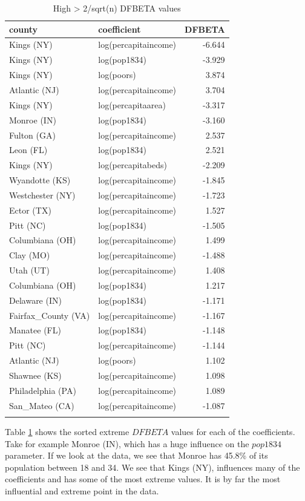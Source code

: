 \documentclass[]{article}
\let\oldparagraph\paragraph
\renewcommand{\paragraph}[1]{\oldparagraph{#1}\mbox{}}
\begin{document}
\begin{longtable}[]{@{}llr@{}}
\caption{High > 2/sqrt(n) DFBETA values}\tabularnewline
\toprule
county & coefficient & DFBETA\tabularnewline
\midrule
\endhead
Kings (NY) & log(percapitaincome) & -6.644\tabularnewline
Kings (NY) & log(pop1834) & -3.929\tabularnewline
Kings (NY) & log(poors) & 3.874\tabularnewline
Atlantic (NJ) & log(percapitaincome) & 3.704\tabularnewline
Kings (NY) & log(percapitaarea) & -3.317\tabularnewline
Monroe (IN) & log(pop1834) & -3.160\tabularnewline
Fulton (GA) & log(percapitaincome) & 2.537\tabularnewline
Leon (FL) & log(pop1834) & 2.521\tabularnewline
Kings (NY) & log(percapitabeds) & -2.209\tabularnewline
Wyandotte (KS) & log(percapitaincome) & -1.845\tabularnewline
Westchester (NY) & log(percapitaincome) & -1.723\tabularnewline
Ector (TX) & log(percapitaincome) & 1.527\tabularnewline
Pitt (NC) & log(pop1834) & -1.505\tabularnewline
Columbiana (OH) & log(percapitaincome) & 1.499\tabularnewline
Clay (MO) & log(percapitaincome) & -1.488\tabularnewline
Utah (UT) & log(percapitaincome) & 1.408\tabularnewline
Columbiana (OH) & log(pop1834) & 1.217\tabularnewline
Delaware (IN) & log(pop1834) & -1.171\tabularnewline
Fairfax\_County (VA) & log(percapitaincome) & -1.167\tabularnewline
Manatee (FL) & log(pop1834) & -1.148\tabularnewline
Pitt (NC) & log(percapitaincome) & -1.144\tabularnewline
Atlantic (NJ) & log(poors) & 1.102\tabularnewline
Shawnee (KS) & log(percapitaincome) & 1.098\tabularnewline
Philadelphia (PA) & log(percapitaincome) & 1.089\tabularnewline
San\_Mateo (CA) & log(percapitaincome) & -1.087\tabularnewline
\bottomrule
\label{table:dfbeta}
\end{longtable}

Table \ref{table:dfbeta} shows the sorted extreme \(DFBETA\) values for each of the
coefficients. Take for example Monroe (IN), which has a huge influence
on the \(pop1834\) parameter. If we look at the data, we see that Monroe
has 45.8\% of its population between 18 and 34. We see that Kings (NY),
influences many of the coefficients and has some of the most extreme
values. It is by far the most influential and extreme point in the data.

\end{document}
